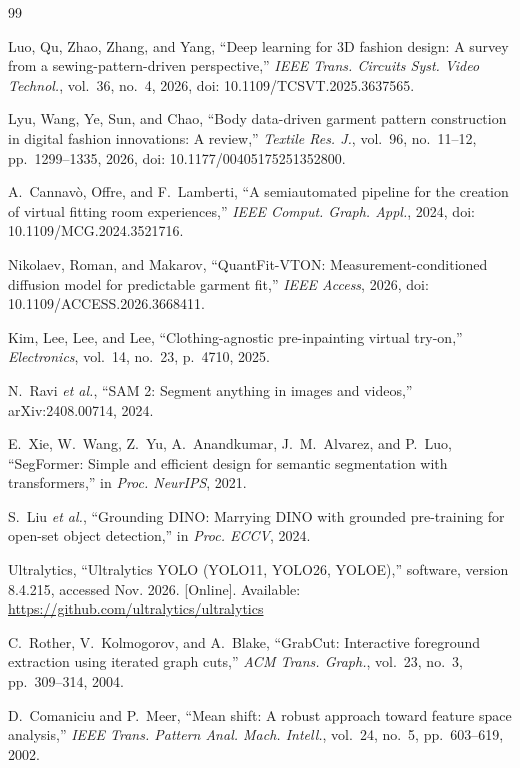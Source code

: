 \documentclass[conference]{IEEEtran}
\begin{document}
\begin{thebibliography}{99}

Luo, Qu, Zhao, Zhang, and Yang, ``Deep learning for 3D fashion design: A survey from a sewing-pattern-driven perspective,'' \emph{IEEE Trans. Circuits Syst. Video Technol.}, vol.~36, no.~4, 2026, doi: 10.1109/TCSVT.2025.3637565.

Lyu, Wang, Ye, Sun, and Chao, ``Body data-driven garment pattern construction in digital fashion innovations: A review,'' \emph{Textile Res. J.}, vol.~96, no.~11--12, pp.~1299--1335, 2026, doi: 10.1177/00405175251352800.

A.~Cannav\`{o}, Offre, and F.~Lamberti, ``A semiautomated pipeline for the creation of virtual fitting room experiences,'' \emph{IEEE Comput. Graph. Appl.}, 2024, doi: 10.1109/MCG.2024.3521716.

Nikolaev, Roman, and Makarov, ``QuantFit-VTON: Measurement-conditioned diffusion model for predictable garment fit,'' \emph{IEEE Access}, 2026, doi: 10.1109/ACCESS.2026.3668411.

Kim, Lee, Lee, and Lee, ``Clothing-agnostic pre-inpainting virtual try-on,'' \emph{Electronics}, vol.~14, no.~23, p.~4710, 2025.

N.~Ravi \emph{et al.}, ``SAM 2: Segment anything in images and videos,'' arXiv:2408.00714, 2024.

E.~Xie, W.~Wang, Z.~Yu, A.~Anandkumar, J.~M.~Alvarez, and P.~Luo, ``SegFormer: Simple and efficient design for semantic segmentation with transformers,'' in \emph{Proc. NeurIPS}, 2021.

S.~Liu \emph{et al.}, ``Grounding DINO: Marrying DINO with grounded pre-training for open-set object detection,'' in \emph{Proc. ECCV}, 2024.

Ultralytics, ``Ultralytics YOLO (YOLO11, YOLO26, YOLOE),'' software, version 8.4.215, accessed Nov. 2026. [Online]. Available: \url{https://github.com/ultralytics/ultralytics}

C.~Rother, V.~Kolmogorov, and A.~Blake, ``GrabCut: Interactive foreground extraction using iterated graph cuts,'' \emph{ACM Trans. Graph.}, vol.~23, no.~3, pp.~309--314, 2004.

D.~Comaniciu and P.~Meer, ``Mean shift: A robust approach toward feature space analysis,'' \emph{IEEE Trans. Pattern Anal. Mach. Intell.}, vol.~24, no.~5, pp.~603--619, 2002.


\end{thebibliography}
\end{document}
